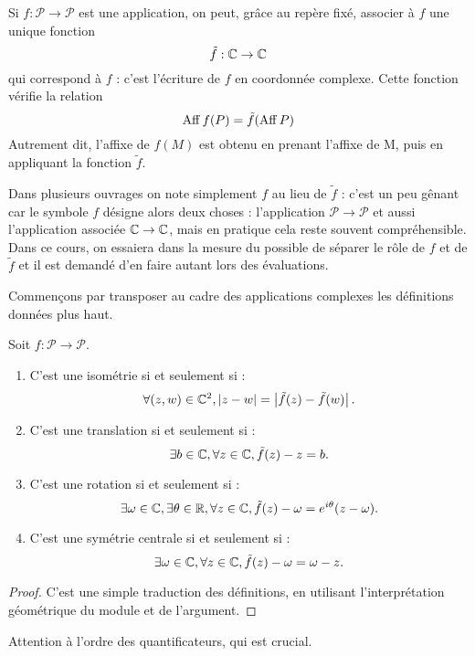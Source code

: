 Si $f  : \mathcal P\to \mathcal P$ est une application, on peut, grâce au repère fixé,  associer à $f$ une unique fonction
\[ \tilde f : \mathbb{C}\to \mathbb{C}\]
qui correspond à $f$ : c'est l'écriture de $f$ en coordonnée complexe. Cette fonction vérifie la relation
\[ \operatorname{Aff}  f(P) = \tilde f(\operatorname{Aff} P)\]
Autrement dit, l'affixe de $f(M)$ est obtenu en prenant l'affixe de M, puis en appliquant la fonction $\tilde f$.

Dans plusieurs ouvrages on note simplement $f$ au lieu de $\tilde f$ : c'est un peu gênant car le symbole $f$ désigne alors deux choses : l'application $\mathcal P\to \mathcal P$ et aussi l'application associée $\mathbb{C}\to\mathbb{C}$, mais en pratique cela reste souvent compréhensible. Dans ce cours, on essaiera dans la mesure du possible de séparer le rôle de $f$ et de $\tilde f$ et il est demandé d'en faire autant lors des évaluations.



Commençons par transposer au cadre des applications complexes les définitions données plus haut.


\begin{proposition}
Soit $f : \mathcal P\to \mathcal P$. 
\begin{enumerate}
\item C'est une isométrie si et seulement si :
\[ \forall (z,w)\in\mathbb{C}^2, \left\lvert z-w\right\rvert = \left\lvert\tilde f(z)-\tilde f(w)\right\rvert.\]
\item C'est une translation si et seulement si :
\[ \exists b\in\mathbb{C}, \forall z\in\mathbb{C}, \tilde f(z)-z=b.\]
\item C'est une rotation si et seulement si :
\[ \exists \omega \in\mathbb{C}, \exists \theta\in\mathbb{R}, \forall z\in\mathbb{C}, \tilde f(z)-\omega = e^{i\theta}(z-\omega).\]
\item C'est une symétrie centrale si et seulement si :
\[ \exists \omega\in\mathbb{C}, \forall z\in\mathbb{C}, \tilde f(z)-\omega=\omega-z.\]
\end{enumerate}
\end{proposition}
\begin{proof}
C'est une simple traduction des définitions, en utilisant l'interprétation géométrique du module et de l'argument.
\end{proof}

\begin{attention}
Attention à l'ordre des quantificateurs, qui est crucial.
\end{attention}




